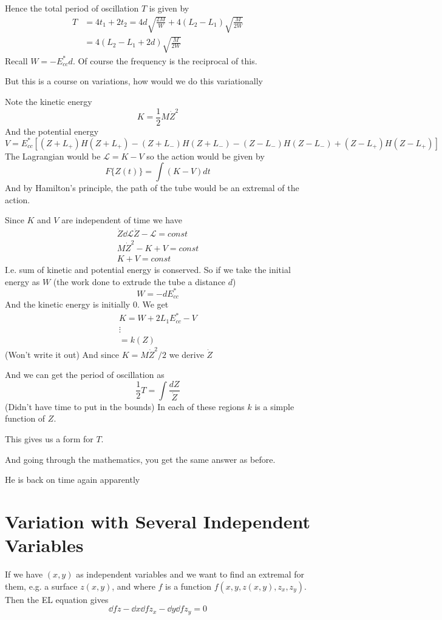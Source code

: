 \documentclass{E:/Documents/Latex/myassignment}
\begin{document}
Hence the total period of oscillation $T$ is given by
\begin{align*}
	T &= 4t_1 + 2t_2 = 4d \sqrt{\frac{2M}{W}} + 4(L_2 - L_1) \sqrt{\frac{M}{2W}}\\
	&= 4(L_2 - L_1 + 2d) \sqrt{\frac{M}{2W}}
\end{align*}
Recall $W = -E_{cc}^* d$.
Of course the frequency is the reciprocal of this.


But this is a course on variations, how would we do this variationally

Note the kinetic energy
\[K = \frac12 M \dot Z^2\]
And the potential energy 
\[V = E_{cc}^* \left[(Z + L_+) H(Z+L_+) - (Z+L_-) H(Z + L_-) - (Z-L_-) H(Z-L_-) + (Z-L_+) H(Z-L_+)\right]\]
The Lagrangian would be $\mathcal{L} = K-V$ so the action would be given by
\[F \{Z(t)\} = \int (K-V) dt\]
And by Hamilton's principle, the path of the tube would be an extremal of the action.


Since $K$ and $V$ are independent of time we have
\begin{align*}
	\dot{Z} \dd{\mathcal{L}}{\dot{Z}} - \mathcal{L} = const\\
	M\dot{Z}^2 - K + V = const\\
	K+V = const
\end{align*}
I.e. sum of kinetic and potential energy is conserved. So if we take the initial energy as $W$ (the work done to extrude the tube a distance $d$) 
\[W = -d E_{cc}^*\]
And the kinetic energy is initially $0$.
We get
\begin{align*}
	K = W + 2L_1 E_{cc}^* - V\\
	\vdots\\
	= k(Z)
\end{align*}
(Won't write it out)
And since $ K = M\dot{Z}^2/2$ we derive $\dot{Z}$


And we can get the period of oscillation as
\[\frac12 T = \int \frac{dZ}{\dot{Z}} \]
(Didn't have time to put in the bounds)
In each of these regions $k$ is a simple function of $Z$.

This gives us a form for $T$.

And going through the mathematics, you get the same answer as before.


He is back on time again apparently




\section{Variation with Several Independent Variables}
If we have $(x,y)$ as independent variables and we want to find an extremal for them, e.g. a surface $z(x,y)$, and where $f$ is a function $f(x,y,z(x,y),z_x,z_y)$. Then the EL equation gives
\[\dd fz - \dd{}x \dd{f}{z_x} - \dd{}y \dd{f}{z_y} = 0\]
\end{document}

